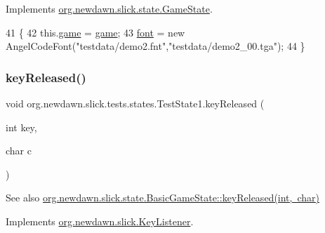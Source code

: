 Implements \mbox{\hyperlink{interfaceorg_1_1newdawn_1_1slick_1_1state_1_1_game_state_aa799a369e0fcfe6822d2d586fa6f5bbc}{org.\+newdawn.\+slick.\+state.\+Game\+State}}.


\begin{DoxyCode}
41                                                                                          \{
42         this.\mbox{\hyperlink{classorg_1_1newdawn_1_1slick_1_1tests_1_1states_1_1_test_state1_a57818ecf2b21da6af28aed24c4412fb1}{game}} = \mbox{\hyperlink{classorg_1_1newdawn_1_1slick_1_1tests_1_1states_1_1_test_state1_a57818ecf2b21da6af28aed24c4412fb1}{game}};
43         \mbox{\hyperlink{classorg_1_1newdawn_1_1slick_1_1tests_1_1states_1_1_test_state1_aa468e72bb425e9f217e3580c6bfae716}{font}} = \textcolor{keyword}{new} AngelCodeFont(\textcolor{stringliteral}{"testdata/demo2.fnt"},\textcolor{stringliteral}{"testdata/demo2\_00.tga"});
44     \}
\end{DoxyCode}
\mbox{\label{classorg_1_1newdawn_1_1slick_1_1tests_1_1states_1_1_test_state1_a0f5e681a7994271ed6db7114015207a7}} 
\subsubsection{\texorpdfstring{key\+Released()}{keyReleased()}}
{\footnotesize\ttfamily void org.\+newdawn.\+slick.\+tests.\+states.\+Test\+State1.\+key\+Released (\begin{DoxyParamCaption}\item[{int}]{key,  }\item[{char}]{c }\end{DoxyParamCaption})\hspace{0.3cm}{\ttfamily [inline]}}

\begin{DoxySeeAlso}{See also}
\mbox{\hyperlink{classorg_1_1newdawn_1_1slick_1_1state_1_1_basic_game_state_ade382929c931cf15998df10559ae1f87}{org.\+newdawn.\+slick.\+state.\+Basic\+Game\+State\+::key\+Released(int, char)}} 
\end{DoxySeeAlso}


Implements \mbox{\hyperlink{interfaceorg_1_1newdawn_1_1slick_1_1_key_listener_a474673b59bc77266bcef3c261c26ee2b}{org.\+newdawn.\+slick.\+Key\+Listener}}.



